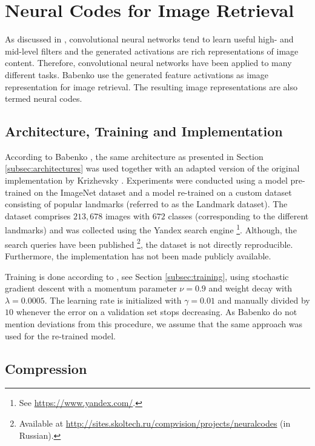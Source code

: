\section{Neural Codes for Image Retrieval}
\label{sec:neural-codes-image-retrieval}

As discussed in \cite{Bengio:2009}, convolutional neural networks tend to learn useful high- and mid-level filters and the generated activations are rich representations of image content. Therefore, convolutional neural networks have been applied to many different tasks. Babenko \etal \cite{BabenkoSlesarevChigorinLempitsky:2014} use the generated feature activations as image representation for image retrieval. The resulting image representations are also termed neural codes.

\subsection{Architecture, Training and Implementation}

According to Babenko \etal, the same architecture as presented in Section \ref{subsec:architectures} was used together with an adapted version of the original implementation by Krizhevsky \cite{KrizhevskySutskeverHinton:2012} \etal.
Experiments were conducted using a model pre-trained on the ImageNet dataset \cite{DengDongSocherLiLiLi:2009} and a model re-trained on a custom dataset consisting of popular landmarks (referred to as the Landmark dataset).
The dataset comprises $213,678$ images with $672$ classes (corresponding to the different landmarks) and was collected using the Yandex search engine
\footnote{
    See \url{https://www.yandex.com/}.
}.
Although, the search queries have been published
\footnote{
    Available at \url{http://sites.skoltech.ru/compvision/projects/neuralcodes} (in Russian).
}, the dataset is not directly reproducible. Furthermore, the implementation has not been made publicly available.

Training is done according to \cite{KrizhevskySutskeverHinton:2012}, see Section \ref{subsec:training}, using stochastic gradient descent with a momentum parameter $\nu = 0.9$ and weight decay with $\lambda = 0.0005$. The learning rate is initialized with $\gamma = 0.01$ and manually divided by $10$ whenever the error on a validation set stops decreasing. As Babenko \etal do not mention deviations from this procedure, we assume that the same approach was used for the re-trained model.

\subsection{Compression}
\label{subsec:compression}

